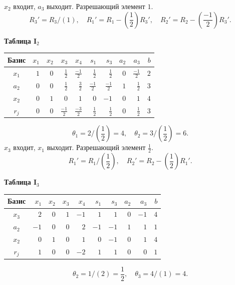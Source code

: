 \documentclass[12pt,a4paper]{article}
\begin{document}
$x_{2}$ входит, $a_{3}$ выходит. Разрешающий элемент $1$.
{\small\[R_{3}'=R_{3}/(1),\quad R_{1}'=R_{1}-(\frac{1}{2})R_{3}',\quad R_{2}'=R_{2}-(\frac{-1}{2})R_{3}'.\]}
\par\textbf{Таблица I$_{2}$}\begin{center}\small\setlength{\tabcolsep}{4pt}\begin{tabular}{c|rrrrrrrr|r}\hline
Базис & $x_{1}$ & $x_{2}$ & \cellcolor{cyan!18}$x_{3}$ & $x_{4}$ & $s_{1}$ & $s_{3}$ & $a_{2}$ & $a_{3}$ & $b$\\\hline
\rowcolor{yellow!25}$x_{1}$ & $1$ & $0$ & \cellcolor{orange!45}$\frac{1}{2}$ & $\frac{-1}{2}$ & $\frac{1}{2}$ & $\frac{1}{2}$ & $0$ & $\frac{-1}{2}$ & $2$\\
$a_{2}$ & $0$ & $0$ & \cellcolor{cyan!18}$\frac{1}{2}$ & $\frac{3}{2}$ & $\frac{-1}{2}$ & $\frac{-1}{2}$ & $1$ & $\frac{1}{2}$ & $3$\\
$x_{2}$ & $0$ & $1$ & \cellcolor{cyan!18}$0$ & $1$ & $0$ & $-1$ & $0$ & $1$ & $4$\\
\hline $r_j$ & $0$ & $0$ & \cellcolor{cyan!18}$\frac{-1}{2}$ & $\frac{-3}{2}$ & $\frac{1}{2}$ & $\frac{1}{2}$ & $0$ & $\frac{1}{2}$ & $3$\\\hline\end{tabular}\end{center}
\[\theta_{1}=2/(\frac{1}{2})=4,\quad \theta_{2}=3/(\frac{1}{2})=6.\]
$x_{3}$ входит, $x_{1}$ выходит. Разрешающий элемент $\frac{1}{2}$.
{\small\[R_{1}'=R_{1}/(\frac{1}{2}),\quad R_{2}'=R_{2}-(\frac{1}{2})R_{1}'.\]}
\newpage
\par\textbf{Таблица I$_{3}$}\begin{center}\small\setlength{\tabcolsep}{4pt}\begin{tabular}{c|rrrrrrrr|r}\hline
Базис & $x_{1}$ & $x_{2}$ & $x_{3}$ & \cellcolor{cyan!18}$x_{4}$ & $s_{1}$ & $s_{3}$ & $a_{2}$ & $a_{3}$ & $b$\\\hline
$x_{3}$ & $2$ & $0$ & $1$ & \cellcolor{cyan!18}$-1$ & $1$ & $1$ & $0$ & $-1$ & $4$\\
\rowcolor{yellow!25}$a_{2}$ & $-1$ & $0$ & $0$ & \cellcolor{orange!45}$2$ & $-1$ & $-1$ & $1$ & $1$ & $1$\\
$x_{2}$ & $0$ & $1$ & $0$ & \cellcolor{cyan!18}$1$ & $0$ & $-1$ & $0$ & $1$ & $4$\\
\hline $r_j$ & $1$ & $0$ & $0$ & \cellcolor{cyan!18}$-2$ & $1$ & $1$ & $0$ & $0$ & $1$\\\hline\end{tabular}\end{center}
\[\theta_{2}=1/(2)=\frac{1}{2},\quad \theta_{3}=4/(1)=4.\]
\end{document}
